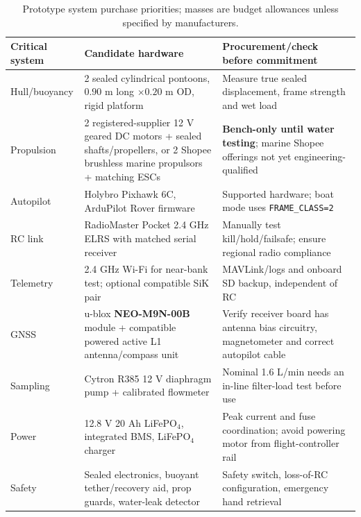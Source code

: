 \documentclass[10pt,a4paper]{article}
\begin{document}
\begin{table}[H]\centering\scriptsize
\caption{Prototype system purchase priorities; masses are budget allowances unless specified by manufacturers.}
\begin{tabularx}{\linewidth}{@{}L{2.3cm}L{3.1cm}Y@{}}\toprule
Critical system & Candidate hardware & Procurement/check before commitment\\\midrule
Hull/buoyancy & 2 sealed cylindrical pontoons, $0.90$ m long $\times0.20$ m OD, rigid platform & Measure true sealed displacement, frame strength and wet load\\
Propulsion & 2 registered-supplier 12 V geared DC motors + sealed shafts/propellers, or 2 Shopee brushless marine propulsors + matching ESCs & \textbf{Bench-only until water testing}; marine Shopee offerings not yet engineering-qualified\\
Autopilot & Holybro Pixhawk 6C, ArduPilot Rover firmware & Supported hardware; boat mode uses \texttt{FRAME\_CLASS=2} \cite{Pixhawk6C,ArduBoat}\\
RC link & RadioMaster Pocket 2.4 GHz ELRS with matched serial receiver & Manually test kill/hold/failsafe; ensure regional radio compliance \cite{RadioMaster}\\
Telemetry & 2.4 GHz Wi-Fi for near-bank test; optional compatible SiK pair & MAVLink/logs and onboard SD backup, independent of RC \cite{SiK}\\
GNSS & u-blox \textbf{NEO-M9N-00B} module + compatible powered active L1 antenna/compass unit & Verify receiver board has antenna bias circuitry, magnetometer and correct autopilot cable \cite{M9N,SparkM9N}\\
Sampling & Cytron R385 12 V diaphragm pump + calibrated flowmeter & Nominal 1.6 L/min needs an in-line filter-load test before use\\
Power & 12.8 V 20 Ah LiFePO$_4$, integrated BMS, LiFePO$_4$ charger & Peak current and fuse coordination; avoid powering motor from flight-controller rail \cite{Bioenno,PM02D}\\
Safety & Sealed electronics, buoyant tether/recovery aid, prop guards, water-leak detector & Safety switch, loss-of-RC configuration, emergency hand retrieval\\\bottomrule\end{tabularx}\end{table}
\end{document}
